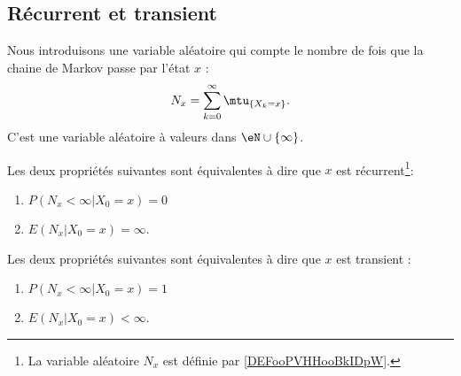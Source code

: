 \subsection{Récurrent et transient}

\begin{definition}		\label{DEFooPVHHooBkIDpW}
	Nous introduisons une variable aléatoire qui compte le nombre de fois que la chaine de Markov passe par l'état \( x\) :
	\begin{equation}    \label{EqDefNxmtuXkn}
		N_x=\sum_{k=0}^{\infty}\mtu_{\{ X_k=x\}}.
	\end{equation}
	C'est une variable aléatoire à valeurs dans \( \eN\cup\{ \infty \}\).
\end{definition}

\begin{proposition} \label{PropEquivEPrecuequiv}
	Les deux propriétés suivantes sont équivalentes à dire que \( x\) est récurrent\footnote{La variable aléatoire \( N_x\) est définie par \ref{DEFooPVHHooBkIDpW}.}:
	\begin{enumerate}
		\item
		      \( P(N_x<\infty|X_0=x)=0\)
		\item
		      \( E(N_x|X_0=x)=\infty\).
	\end{enumerate}
	Les deux propriétés suivantes sont équivalentes à dire que \( x\) est transient :
	\begin{enumerate}
		\item   \label{ItemiMnGpD}
		      \( P(N_x<\infty|X_0=x)=1\)
		\item
		      \( E(N_x|X_0=x)<\infty\).
	\end{enumerate}
\end{proposition}

